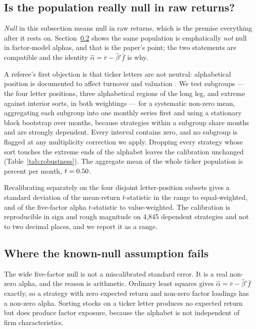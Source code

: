 \documentclass{article}
\begin{document}
\subsection{Is the population really null in raw returns?}

\emph{Null} in this subsection means null in raw returns, which is the premise
everything after it rests on. Section~\ref{sec:nullfails} shows the same
population is emphatically \emph{not} null in factor-model alphas, and that is
the paper's point; the two statements are compatible and the identity
$\hat\alpha = \bar r - \hat\beta'\bar f$ is why.

A referee's first objection is that ticker letters are not neutral: alphabetical
position is documented to affect turnover and valuation \citep{itzkowitz2016}.
We test \bzooalphabetTests{} subgroups --- the four letter positions, three
alphabetical regions of the long leg, and extreme against interior sorts, in
both weightings --- for a systematic non-zero mean, aggregating each subgroup
into one monthly series first and using a stationary block bootstrap over
months, because strategies within a subgroup share months and are strongly
dependent. Every interval contains zero, and no subgroup is flagged at any
multiplicity correction we apply. Dropping every strategy whose sort touches the extreme ends
of the alphabet leaves the calibration unchanged
(Table~\ref{tab:robustness}). The aggregate mean of the whole ticker population
is \bzootickerMeanEw{} percent per month, $t = 0.50$.

Recalibrating separately on the four disjoint letter-position subsets gives a
standard deviation of the mean-return $t$-statistic in the range
\bzoosubpopSdLowEw{} to \bzoosubpopSdHighEw{} equal-weighted, and of the
five-factor alpha $t$-statistic \bzoosubpopFfSdLowVw{} to
\bzoosubpopFfSdHighVw{} value-weighted. The calibration is reproducible in sign
and rough magnitude on 4{,}845 dependent strategies and not to two decimal
places, and we report it as a range.

\subsection{Where the known-null assumption fails}
\label{sec:nullfails}

The wide five-factor null is not a miscalibrated standard error. It is a real
non-zero alpha, and the reason is arithmetic. Ordinary least squares gives
$\hat\alpha = \bar r - \hat\beta' \bar f$ exactly, so a strategy with zero
expected return and non-zero factor loadings has a non-zero alpha. Sorting
stocks on a ticker letter produces no expected return but does produce factor
exposure, because the alphabet is not independent of firm characteristics.
\end{document}
